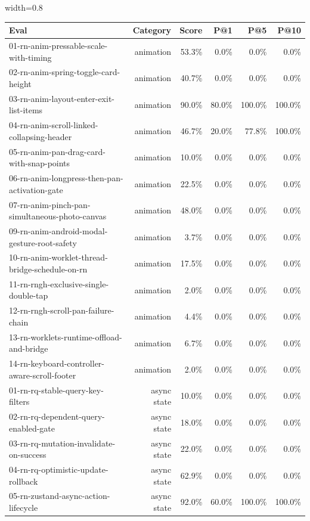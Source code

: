 \begin{table}[htbp]
\centering
\begin{adjustbox}{width=0.8\textwidth}
\begin{tabular}{lrrrrr}
\toprule
Eval & Category & Score & P@1 & P@5 & P@10 \\
\midrule
01-rn-anim-pressable-scale-with-timing & animation & 53.3\% & 0.0\% & 0.0\% & 0.0\% \\
02-rn-anim-spring-toggle-card-height & animation & 40.7\% & 0.0\% & 0.0\% & 0.0\% \\
03-rn-anim-layout-enter-exit-list-items & animation & 90.0\% & 80.0\% & 100.0\% & 100.0\% \\
04-rn-anim-scroll-linked-collapsing-header & animation & 46.7\% & 20.0\% & 77.8\% & 100.0\% \\
05-rn-anim-pan-drag-card-with-snap-points & animation & 10.0\% & 0.0\% & 0.0\% & 0.0\% \\
06-rn-anim-longpress-then-pan-activation-gate & animation & 22.5\% & 0.0\% & 0.0\% & 0.0\% \\
07-rn-anim-pinch-pan-simultaneous-photo-canvas & animation & 48.0\% & 0.0\% & 0.0\% & 0.0\% \\
09-rn-anim-android-modal-gesture-root-safety & animation & 3.7\% & 0.0\% & 0.0\% & 0.0\% \\
10-rn-anim-worklet-thread-bridge-schedule-on-rn & animation & 17.5\% & 0.0\% & 0.0\% & 0.0\% \\
11-rn-rngh-exclusive-single-double-tap & animation & 2.0\% & 0.0\% & 0.0\% & 0.0\% \\
12-rn-rngh-scroll-pan-failure-chain & animation & 4.4\% & 0.0\% & 0.0\% & 0.0\% \\
13-rn-worklets-runtime-offload-and-bridge & animation & 6.7\% & 0.0\% & 0.0\% & 0.0\% \\
14-rn-keyboard-controller-aware-scroll-footer & animation & 2.0\% & 0.0\% & 0.0\% & 0.0\% \\
01-rn-rq-stable-query-key-filters & async state & 10.0\% & 0.0\% & 0.0\% & 0.0\% \\
02-rn-rq-dependent-query-enabled-gate & async state & 18.0\% & 0.0\% & 0.0\% & 0.0\% \\
03-rn-rq-mutation-invalidate-on-success & async state & 22.0\% & 0.0\% & 0.0\% & 0.0\% \\
04-rn-rq-optimistic-update-rollback & async state & 62.9\% & 0.0\% & 0.0\% & 0.0\% \\
05-rn-zustand-async-action-lifecycle & async state & 92.0\% & 60.0\% & 100.0\% & 100.0\% \\

\end{tabular}
\end{adjustbox}
\end{table}

